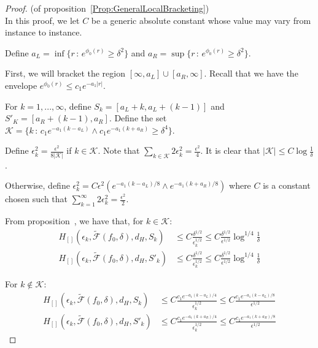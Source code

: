 \documentclass[12pt]{article}
\begin{document}
\begin{proof} (of proposition~\ref{Prop:GeneralLocalBracketing})\\

  In this proof, we let $C$ be a generic absolute constant whose value may vary from instance to instance.
  
  Define $a_L = \inf \{ r \,:\, e^{\phi_0(r)} \geq \delta^2\}$ and $a_R = \sup \{ r \,:\, e^{\phi_0(r)} \geq \delta^2\}$. 

  First, we will bracket the region $[\infty, a_L] \cup [a_R, \infty]$. Recall that we have the envelope $e^{\phi_0(r)} \leq c_1 e^{- a_1 |r|}$.
  
  For $k = 1,...,\infty$, define $S_k = [a_L+k, a_L+(k-1)]$ and $S'_K = [a_R + (k-1), a_R]$. Define the set $\mathcal{K} = \{k \,:\, c_1 e^{-a_1(k - a_L)} \wedge c_1 e^{-a_1(k + a_R)} \geq \delta^4 \}$.
  
  Define $\epsilon^2_k = \frac{\epsilon^2 }{8 |\mathcal{K}|}$ if $k \in \mathcal{K}$. Note that $\sum_{k \in \mathcal{K}} 2 \epsilon^2_k = \frac{\epsilon^2}{4}$. It is clear that $|\mathcal{K}| \leq C \log \frac{1}{\delta}$. 

  Otherwise, define $\epsilon^2_k = C \epsilon^2 (e^{-a_1(k - a_L)/8} \wedge e^{-a_1(k+a_R)/8})$ where $C$ is a constant chosen such that $\sum_{k=1}^\infty 2\epsilon^2_k = \frac{\epsilon^2}{2}$.
  
  
  From proposition~\label{prop:segment_bracket1}, we have that, for $k \in \mathcal{K}$:
  \begin{align*}
    H_{[]}(\epsilon_k, \tilde{\mathcal{F}}(f_0, \delta), d_H, S_k)
    &\leq C \frac{\delta^{1/2}}{\epsilon_k^{1/2}} 
      \leq C  \frac{\delta^{1/2}}{\epsilon^{1/2}} \log^{1/4} \frac{1}{\delta} \\
    H_{[]}(\epsilon_k, \tilde{\mathcal{F}}(f_0, \delta), d_H, S'_k)
    &\leq C \frac{\delta^{1/2}}{\epsilon_k^{1/2}} 
    \leq C \frac{\delta^{1/2}}{\epsilon^{1/2}} \log^{1/4} \frac{1}{\delta}
  \end{align*}

  For $k \notin \mathcal{K}$:
  \begin{align*}
    H_{[]}(\epsilon_k, \tilde{\mathcal{F}}(f_0, \delta), d_H, S_k)
    &\leq C \frac{c_1 e^{-a_1(k - a_L)/4}}{\epsilon_k^{1/2}}
      \leq C \frac{c_1 e^{-a_1(k - a_L)/8}}{\epsilon^{1/2}}\\
    H_{[]}(\epsilon_k, \tilde{\mathcal{F}}(f_0, \delta), d_H, S'_k)
    &\leq C \frac{c_1 e^{-a_1(k + a_R)/4}}{\epsilon_k^{1/2}}
      \leq C \frac{c_1 e^{-a_1(k + a_R)/8}}{\epsilon^{1/2}}
  \end{align*}
  

\end{proof}
\end{document}
